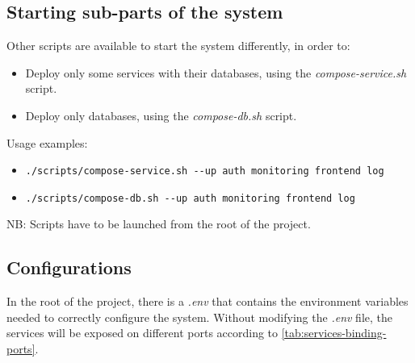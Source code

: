 \documentclass{scrartcl}
\begin{document}
    \subsection{Starting sub-parts of the system}

    Other scripts are available to start the system differently, in order to:

    \begin{itemize}
        \item Deploy only some services with their databases, using the \textit{compose-service.sh} script.
        \item Deploy only databases, using the \textit{compose-db.sh} script.
    \end{itemize}

    Usage examples:

    \begin{itemize}
        \item \verb|./scripts/compose-service.sh --up auth monitoring frontend log|
        \item \verb|./scripts/compose-db.sh --up auth monitoring frontend log|
    \end{itemize}

    NB: Scripts have to be launched from the root of the project.

    \subsection{Configurations}
    In the root of the project, there is a \textit{.env} that contains the environment variables needed to correctly configure the system.
    Without modifying the \textit{.env} file, the services will be exposed on different ports according to \cref{tab:services-binding-ports}.
\end{document}

